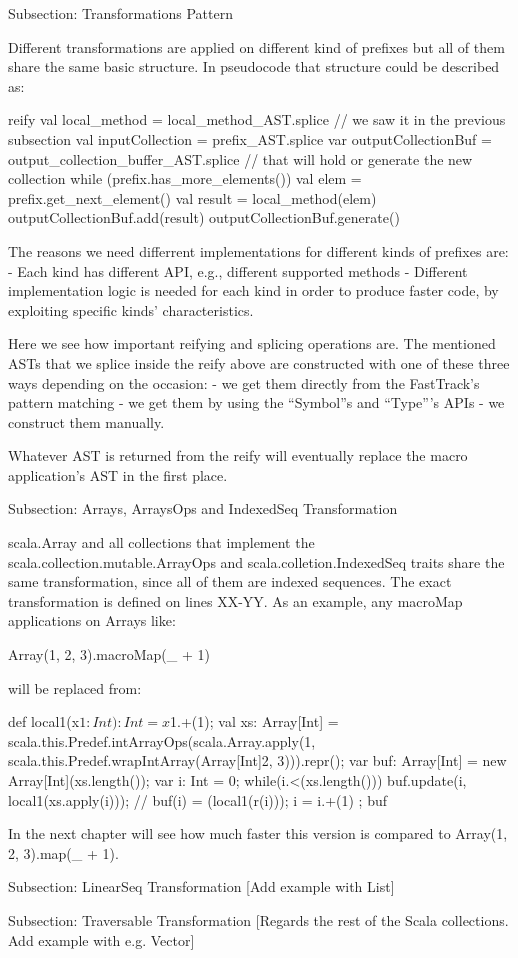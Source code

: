 Subsection: Transformations Pattern

Different transformations are applied on different kind of prefixes but all of
them share the same basic structure. In pseudocode that structure could be
described as:

reify {
  val local_method = local_method_AST.splice // we saw it in the previous
subsection
  val inputCollection = prefix_AST.splice
  var outputCollectionBuf = output_collection_buffer_AST.splice // that will
hold or generate the new collection
  while (prefix.has_more_elements()) {
    val elem = prefix.get_next_element()
    val result = local_method(elem)
    outputCollectionBuf.add(result)
  }
  outputCollectionBuf.generate()
}

The reasons we need differrent implementations for different kinds of
prefixes are:
- Each kind has different API, e.g., different supported methods
- Different implementation logic is needed for each kind in order to produce
faster code, by exploiting specific kinds' characteristics.

Here we see how important reifying and splicing operations are. The mentioned
ASTs that we splice inside the reify above are constructed with one of these
three ways depending on the occasion:
- we get them directly from the FastTrack's pattern matching
- we get them by using the ``Symbol''s and ``Type'''s APIs
- we construct them manually.

Whatever AST is returned from the reify will eventually replace the macro
application's AST in the first place.


Subsection: Arrays, ArraysOps and IndexedSeq Transformation

scala.Array and all collections that implement the 
scala.collection.mutable.ArrayOps and scala.colletion.IndexedSeq traits share
the same transformation, since all of them are indexed sequences. The exact
transformation is defined on lines XX-YY. As an example, any macroMap
applications on Arrays like:

Array(1, 2, 3).macroMap(_ + 1)

will be replaced from:

{
  def local1(x$1: Int): Int = x$1.+(1);
  val xs: Array[Int] = scala.this.Predef.intArrayOps(scala.Array.apply(1,
scala.this.Predef.wrapIntArray(Array[Int]{2, 3}))).repr();
  var buf: Array[Int] = new Array[Int](xs.length());
  var i: Int = 0;
  while(i.<(xs.length())){
    buf.update(i, local1(xs.apply(i))); // buf(i) = (local1(r(i)));
    i = i.+(1)
  };
  buf
}

In the next chapter will see how much faster this version is compared to
Array(1, 2, 3).map(_ + 1).


Subsection: LinearSeq Transformation
[Add example with List]


Subsection: Traversable Transformation
[Regards the rest of the Scala collections. Add example with e.g. Vector]
